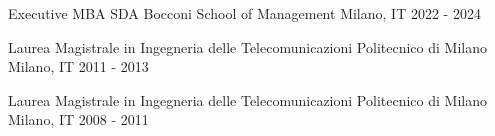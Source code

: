 
\begin{cventries}
  \cventrynodata
    {Executive MBA} %
    {SDA Bocconi School of Management} %
    {Milano, IT} %
    {2022 - 2024} %
    
  \cventrynodata
    {Laurea Magistrale in Ingegneria delle Telecomunicazioni} %
    {Politecnico di Milano} %
    {Milano, IT} %
    {2011 - 2013} %
    
  \cventrynodata
    {Laurea Magistrale in Ingegneria delle Telecomunicazioni} %
    {Politecnico di Milano} %
    {Milano, IT} %
    {2008 - 2011} %
\end{cventries}
